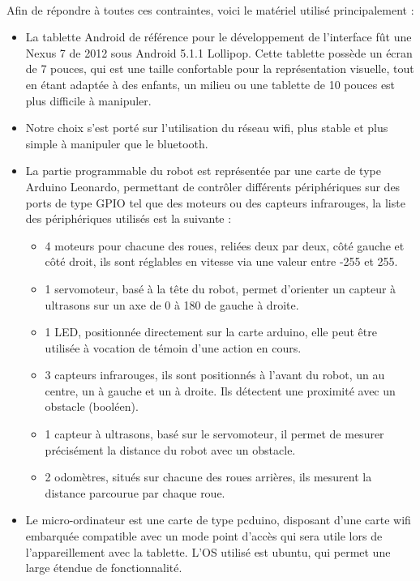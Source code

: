 \documentclass[a4paper]{article}
\begin{document}
\paragraph{}
Afin de répondre à toutes ces contraintes, voici le matériel utilisé principalement :
\begin{itemize}
\item La tablette Android de référence pour le développement de l’interface fût une Nexus 7 de 2012 sous Android 5.1.1 Lollipop. Cette tablette possède un écran de 7 pouces, qui est une taille confortable pour la représentation visuelle, tout en étant adaptée à des enfants, un milieu ou une tablette de 10 pouces est plus difficile à manipuler.
\item Notre choix s’est porté sur l’utilisation du réseau wifi, plus stable et plus simple à manipuler que le bluetooth. 
\item La partie programmable du robot est représentée par une carte de type Arduino Leonardo, permettant de contrôler différents périphériques sur des ports de type GPIO tel que des moteurs ou des capteurs infrarouges, la liste des périphériques utilisés est la suivante :
\begin{itemize}
\item 4 moteurs pour chacune des roues, reliées deux par deux, côté gauche et côté droit, ils sont réglables en vitesse via une valeur entre -255 et 255.
\item 1 servomoteur, basé à la tête du robot, permet d’orienter un capteur à ultrasons sur un axe de 0 à 180 de gauche à droite.
\item 1 LED, positionnée directement sur la carte arduino, elle peut être utilisée à vocation de témoin d’une action en cours.
\item 3 capteurs infrarouges, ils sont positionnés à l’avant du robot, un au centre, un à gauche et un à droite. Ils détectent une proximité avec un obstacle (booléen).
\item 1 capteur à ultrasons, basé sur le servomoteur, il permet de mesurer précisément la distance du robot avec un obstacle.
\item 2 odomètres, situés sur chacune des roues arrières, ils mesurent la distance parcourue par chaque roue.
\end{itemize}
\item Le micro-ordinateur est une carte de type pcduino, disposant d’une carte wifi embarquée compatible avec un mode point d'accès qui sera utile lors de l’appareillement avec la tablette. L’OS utilisé est ubuntu, qui permet une large étendue de fonctionnalité.
\end{itemize}
\end{document}
